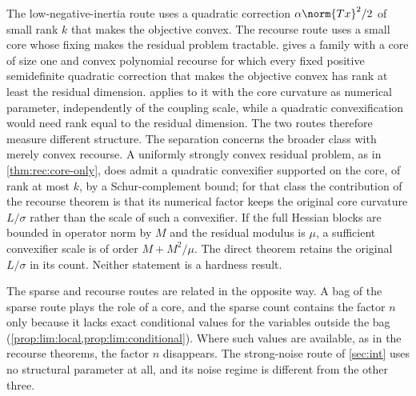 The low-negative-inertia route uses a quadratic correction
$\alpha\norm{Tx}^2/2$ of small rank $k$ that makes the objective convex. The
recourse route uses a small core whose fixing makes the residual problem
tractable.  gives a family with a core of size one and
convex polynomial recourse for which every fixed positive semidefinite
quadratic correction that makes the objective convex has rank at least the
residual dimension.  applies to it with the core
curvature as numerical parameter, independently of the coupling scale, while
a quadratic convexification would need rank equal to the residual
dimension. The two routes therefore measure different structure. The separation concerns the
broader class with merely convex recourse. A uniformly strongly convex
residual problem, as in \cref{thm:rec:core-only}, does admit a quadratic
convexifier supported on the core, of rank at most $k$, by a Schur-complement
bound; for that class the contribution of the recourse theorem is that its
numerical factor keeps the original core curvature $L/\sigma$ rather than the
scale of such a convexifier. If the full Hessian blocks are bounded in
operator norm by $M$ and the residual modulus is $\mu$, a sufficient
convexifier scale is of order $M+M^2/\mu$. The direct theorem retains the
original $L/\sigma$ in its count. Neither statement is a hardness result.

The sparse and recourse routes are related in the opposite way. A bag of the
sparse route plays the role of a core, and the sparse count contains the
factor $n$ only because it lacks exact conditional values for the variables
outside the bag (\cref{prop:lim:local,prop:lim:conditional}). Where such
values are available, as in the recourse theorems, the factor $n$
disappears. The strong-noise
route of \cref{sec:int} uses no structural parameter at all, and its noise
regime is different from the other three.
